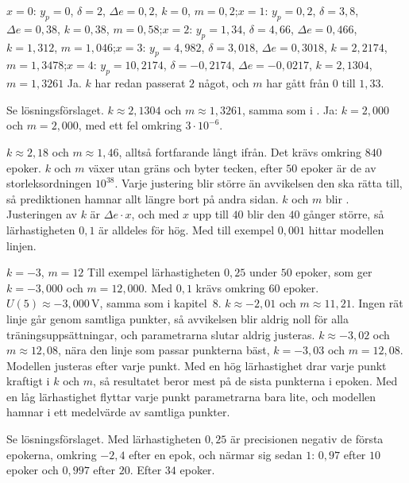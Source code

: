 \begin{facit}
  $x = 0$: $y_p = 0$, $\delta = 2$, $\Delta e = 0{,}2$, $k = 0$,
$m = 0{,}2$;\enspace $x = 1$: $y_p = 0{,}2$, $\delta = 3{,}8$, $\Delta e = 0{,}38$, $k = 0{,}38$,
$m = 0{,}58$;\enspace $x = 2$: $y_p = 1{,}34$, $\delta = 4{,}66$, $\Delta e = 0{,}466$,
$k = 1{,}312$, $m = 1{,}046$;\enspace $x = 3$: $y_p = 4{,}982$, $\delta = 3{,}018$,
$\Delta e = 0{,}3018$, $k = 2{,}2174$, $m = 1{,}3478$;\enspace $x = 4$: $y_p = 10{,}2174$,
$\delta = -0{,}2174$, $\Delta e = -0{,}0217$, $k = 2{,}1304$, $m = 1{,}3261$
 Ja. $k$ har redan passerat $2$ något, och $m$ har gått från $0$ till $1{,}33$.

  Se lösningsförslaget.  $k \approx 2{,}1304$ och $m \approx 1{,}3261$,
samma som i .  Ja: $k = 2{,}000$ och $m = 2{,}000$, med ett fel omkring
$3 \cdot 10^{-6}$.

  $k \approx 2{,}18$ och $m \approx 1{,}46$, alltså fortfarande långt ifrån. Det
krävs omkring $840$ epoker.
 $k$ och $m$ växer utan gräns och byter tecken, efter $50$ epoker är de av storleksordningen
$10^{38}$. Varje justering blir större än avvikelsen den ska rätta till, så prediktionen hamnar
allt längre bort på andra sidan.
 $k$ och $m$ blir . Justeringen av $k$ är $\Delta e \cdot x$, och med $x$ upp till
$40$ blir den $40$ gånger större, så lärhastigheten $0{,}1$ är alldeles för hög. Med till exempel
$0{,}001$ hittar modellen linjen.

  $k = -3$, $m = 12$
 Till exempel lärhastigheten $0{,}25$ under $50$ epoker, som ger $k = -3{,}000$ och
$m = 12{,}000$. Med $0{,}1$ krävs omkring $60$ epoker.
 $U(5) \approx -3{,}000\,\text{V}$, samma som i kapitel~8.
 $k \approx -2{,}01$ och $m \approx 11{,}21$. Ingen rät linje går genom samtliga punkter, så
avvikelsen blir aldrig noll för alla träningsuppsättningar, och parametrarna slutar aldrig
justeras.
 $k \approx -3{,}02$ och $m \approx 12{,}08$, nära den linje som passar punkterna bäst,
$k = -3{,}03$ och $m = 12{,}08$. Modellen justeras efter varje punkt. Med en hög lärhastighet drar
varje punkt kraftigt i $k$ och $m$, så resultatet beror mest på de sista punkterna i epoken. Med
en låg lärhastighet flyttar varje punkt parametrarna bara lite, och modellen hamnar i ett
medelvärde av samtliga punkter.

  Se lösningsförslaget.
 Med lärhastigheten $0{,}25$ är precisionen negativ de första epokerna, omkring $-2{,}4$
efter en epok, och närmar sig sedan $1$: $0{,}97$ efter $10$ epoker och $0{,}997$ efter $20$.
 Efter $34$ epoker.


\end{facit}
